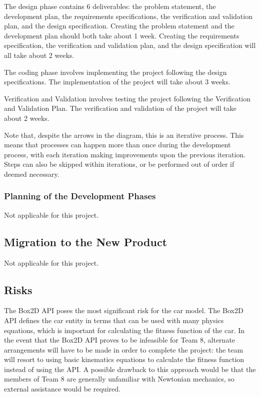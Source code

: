 \documentclass[12pt, titlepage]{article}
\begin{document}
The design phase contains 6 deliverables: the problem statement, the development 
plan, the requirements specifications, the verification and validation plan, and 
the design specification. Creating the problem statement and the development 
plan should both take about 1 week. Creating the requirements specification, the 
verification and validation plan, and the design specification will all take 
about 2 weeks.

The coding phase involves implementing the project following the design 
specifications. The implementation of the project will take about 3 weeks.

Verification and Validation involves testing the project following the 
Verification and Validation Plan. The verification and validation of the project 
will take about 2 weeks.

Note that, despite the arrows in the diagram, this is an iterative process. This 
means that processes can happen more than once during the development process, 
with each iteration making improvements upon the previous iteration. Steps can 
also be skipped within iterations, or be performed out of order if deemed 
necessary. 

\subsubsection{Planning of the Development Phases}
Not applicable for this project.

\subsection{Migration to the New Product}
Not applicable for this project.

\subsection{Risks}
The Box2D API poses the most signiﬁcant risk for the car model. The Box2D 
API deﬁnes the car entity in terms that can be used with many physics 
equations, which is important for calculating the ﬁtness function of the 
car. In the event that the Box2D API proves to be infeasible for Team 8, 
alternate arrangements will have to be made in order to complete the
project: the team will resort to using basic kinematics equations to calculate 
the ﬁtness function instead of using the API. A possible drawback to this 
approach would be that the members of Team 8 are generally unfamiliar with 
Newtonian mechanics, so external assistance would be required. 
\end{document}

